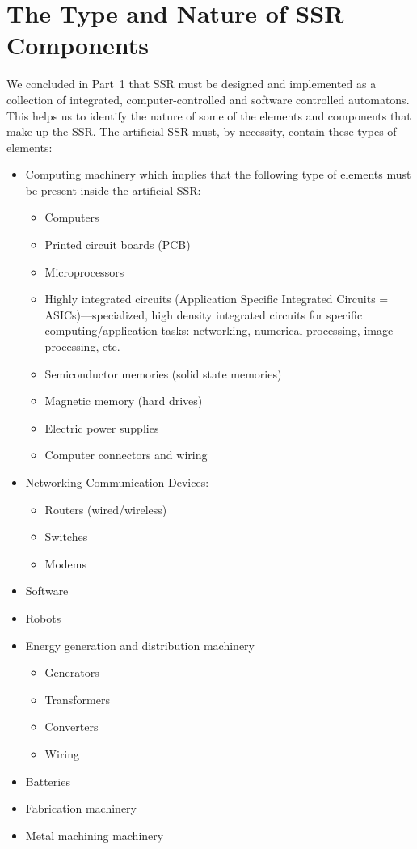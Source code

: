 \section{The Type and Nature of SSR Components}

We concluded in Part~1 that SSR must be designed and implemented as
a collection of integrated, computer-controlled and software controlled
automatons. This helps us to identify the nature of some of the
elements and components that make up the SSR. The artificial SSR must,
by necessity, contain these types of elements:

\begin{itemize}
\item Computing machinery which implies that the following type of
elements must be present inside the artificial SSR:

\begin{itemize}
\item Computers
\item Printed circuit boards (PCB)
\item Microprocessors
\item Highly integrated circuits (Application Specific Integrated
Circuits = ASICs)---specialized, high density integrated circuits for
specific computing/application tasks: networking, numerical processing,
image processing, etc.
\item Semiconductor memories (solid state memories)
\item Magnetic memory (hard drives)
\item Electric power supplies
\item Computer connectors and wiring
\end{itemize}
\item Networking Communication Devices:

\begin{itemize}
\item Routers (wired/wireless)
\item Switches
\item Modems
\end{itemize}
\item Software
\item Robots
\item Energy generation and distribution machinery

\begin{itemize}
\item Generators
\item Transformers
\item Converters
\item Wiring
\end{itemize}
\item Batteries
\item Fabrication machinery
\item Metal machining machinery
\end{itemize}

